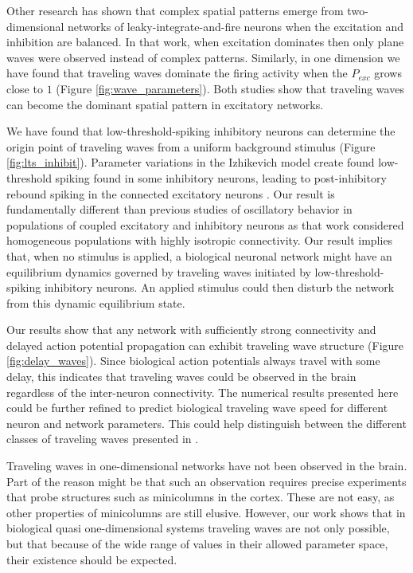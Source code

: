 \documentclass[12pt]{article}
\begin{document}
Other research \parencite{keane2015} has shown that complex spatial patterns emerge from two-dimensional networks of leaky-integrate-and-fire neurons when the excitation and inhibition are balanced.
In that work, when excitation dominates then only plane waves were observed instead of complex patterns.
Similarly, in one dimension we have found that traveling waves dominate the firing activity when the $P_{exc}$ grows close to $1$ (Figure \ref{fig:wave_parameters}).
Both studies show that traveling waves can become the dominant spatial pattern in excitatory networks.

We have found that low-threshold-spiking inhibitory neurons can determine the origin point of traveling waves from a uniform background stimulus \color{red}(Figure \ref{fig:lts_inhibit})\color{black}.
\color{red}
Parameter variations in the Izhikevich model \parencite{izhikevich2003} create found low-threshold spiking found in some inhibitory neurons\parencite{gibson2009}\parencite{hayut2011}, leading to post-inhibitory rebound spiking in the connected excitatory neurons \parencite{ascoli2010}.
Our result is fundamentally different than previous studies of oscillatory behavior in populations of coupled excitatory and inhibitory neurons \parencite{Golomb1996}\parencite{Golomb1999} as that work considered homogeneous populations with highly isotropic connectivity.
\color{black}
Our result implies that, when no stimulus is applied, a biological neuronal network might have an equilibrium dynamics governed by traveling waves initiated by low-threshold-spiking inhibitory neurons.
An applied stimulus could then disturb the network from this dynamic equilibrium state.

\color{red}Our results show \color{black} that any network with sufficiently strong connectivity and delayed action potential propagation can exhibit traveling wave structure (Figure \ref{fig:delay_waves}).
Since biological action potentials always travel with some delay, this indicates that traveling waves could be observed in the brain regardless of the inter-neuron connectivity.
The numerical results presented here could be further refined to predict biological traveling wave speed for different neuron and network parameters.
This could help distinguish between the different classes of traveling waves presented in \parencite{ermentrout2001}.

Traveling waves in one-dimensional networks have not been observed in the brain. 
Part of the reason might be that such an observation requires precise experiments that probe structures such as minicolumns in the cortex. 
These are not easy, as other properties of minicolumns are still elusive. 
However, our work shows that \color{red}in biological quasi one-dimensional systems \color{black} traveling waves are not only possible, but that because of the wide range of values in their allowed parameter space, their existence should be expected.


\clearpage
\printbibliography
\end{document}
